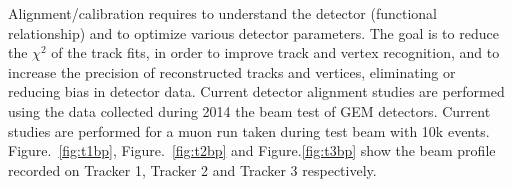 Alignment/calibration requires to understand the detector (functional relationship) and to optimize various detector  parameters.
The goal is to reduce the $\chi^{2}$ of the track fits, in order to improve track and vertex recognition, and to increase the precision of reconstructed tracks and vertices, eliminating or reducing bias in detector data.
Current detector alignment studies are performed using the data collected during 2014 the beam test of GEM detectors. 
Current studies are performed for a muon run taken during test beam with 10k events.
Figure.~\ref{fig:t1bp}, Figure.~\ref{fig:t2bp} and Figure.\ref{fig:t3bp} show the beam profile recorded on Tracker 1, Tracker 2 and Tracker 3 respectively. 
